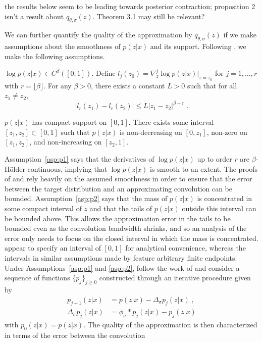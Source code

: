 \documentclass[10pt]{article}
\begin{document}
\todo the results below seem to be leading towards posterior contraction; proposition 2 isn't a result about $q_{\theta,\sigma}(z)$. Theorem 3.1 may still be relevant?

We can further quantify the quality of the approximation by $q_{\theta,\sigma}(z)$ if we make assumptions about the smoothness of $p(z|x)$ and its support. Following \citet{Plummer:2021}, we make the following assumptions.

\begin{assumption} \label{asp:p1}
$\log p(z|x) \in C^\beta([0,1])$. Define $l_j(z_0) = \nabla_z^j\log p(z|x)\big|_{z=z_0}$ for $j=1,\ldots,r$ with $r=\lfloor\beta\rfloor$. For any $\beta>0$, there exists a constant $L>0$ such that for all $z_1\neq z_2$,
\[
|l_r(z_1)-l_r(z_2)| \leq L|z_1-z_2|^{\beta-r} \;.
\]
\end{assumption}

\begin{assumption} \label{asp:p2}
$p(z|x)$ has compact support on $[0,1]$. There exists some interval $[z_1,z_2]\subset[0,1]$ such that $p(z|x)$ is non-decreasing on $[0,z_1]$, non-zero on $[z_1,z_2]$, and non-increasing on $[z_2,1]$.
\end{assumption}

Assumption~\ref{asp:p1} says that the derivatives of $\log p(z|x)$ up to order $r$ are $\beta$-H\"{o}lder continuous, implying that $\log p(z|x)$ is smooth to an extent. The proofs of \citet{Kruijer:2010} and \citet{Plummer:2021} rely heavily on the assumed smoothness in order to ensure that the error between the target distribution and an approximating convolution can be bounded. Assumption~\ref{asp:p2} says that the mass of $p(z|x)$ is concentrated in some compact interval of $z$ and that the tails of $p(z|x)$ outside this interval can be bounded above. This allows the approximation error in the tails to be bounded even as the convolution bandwidth shrinks, and so an analysis of the error only needs to focus on the closed interval in which the mass is concentrated. \citet{Plummer:2021} appear to specify an interval of $[0,1]$ for analytical convenience, whereas the intervals in similar assumptions made by \citet{Ghosal:1999} feature arbitrary finite endpoints.
\\

Under Assumptions~\ref{asp:p1} and \ref{asp:p2}, \citet{Plummer:2021} follow the work of \citet{Kruijer:2010} and consider a sequence of functions $\{p_j\}_{j\geq0}$ constructed through an iterative procedure given by
\begin{align*}
p_{j+1}(z|x) &= p(z|x) - \Delta_\sigma p_j(z|x) \;, \\
\Delta_\sigma p_j(z|x) &= \phi_\sigma * p_j(z|x) - p_j(z|x)
\end{align*}
with $p_0(z|x)=p(z|x)$. The quality of the approximation is then characterized in terms of the error between the convolution \todo
\end{document}
